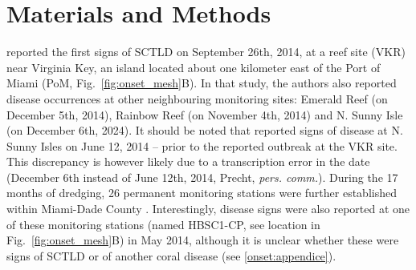 \documentclass[preprint,12pt,authoryear]{elsarticle}
\begin{document}
\section{Materials and Methods}
\cite{precht2016unprecedented} reported the first signs of SCTLD on September 26th, 2014, at a reef site (VKR) near Virginia Key, an island located about one kilometer east of the Port of Miami (PoM, Fig.~\ref{fig:onset_mesh}B). In that study, the authors also reported disease occurrences at other neighbouring monitoring sites: Emerald Reef (on December 5th, 2014), Rainbow Reef (on November 4th, 2014) and N. Sunny Isle (on December 6th, 2024). It should be noted that \cite{precht2016unprecedented} reported signs of disease at N. Sunny Isles on June 12, 2014 -- prior to the reported outbreak at the VKR site. This discrepancy is however likely due to a transcription error in the date (December 6th instead of June 12th, 2014, Precht, \textit{pers. comm.}). During the 17 months of dredging, 26 permanent monitoring stations were further established within Miami-Dade County \citep{gintert2019regional}. Interestingly, disease signs were also reported at one of these monitoring stations (named HBSC1-CP, see location in Fig.~\ref{fig:onset_mesh}B) in May 2014, although it is unclear whether these were signs of SCTLD or of another coral disease (see \ref{onset:appendice}).
\end{document}
